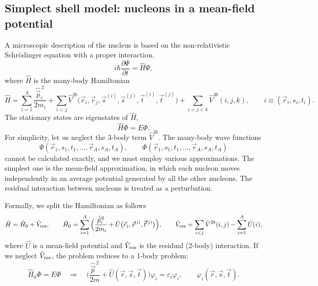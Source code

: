 \documentclass[11pt,a4paper]{article}
\newcommand{\op}[1]{\hat{#1}}
\begin{document}
\subsection{Simplect shell model: nucleons in a mean-field potential}
A microscopic description of the nucleus is based on the non-relativistic Schr\"odinger equation with a proper interaction. 
\[
i\hbar\frac{\partial\Psi}{\partial t}=\op H\Psi ,
\]
where $\op H$ is the many-body Hamiltonian
\[
\op H=\sum_{i=1}^A\frac{\op{\vec p}_i^{\,2}}{2m_i}
+\sum_{i<j}\op V^{2b}\big(\vec r_i,\vec r_j,\vec s^{(i)},\vec s^{(j)},\vec t^{(i)},\vec t^{(j)}\big)
+\sum_{i<j<k}\op V^{3b}(i,j,k),
\qquad i\equiv(\vec r_i,s_i,t_i).
\]
The stationary states are eigenstates of $\op H$,
\[
\op H\Phi=E\Phi .
\]
For simplicity, let us neglect the 3-body term $\op V^{3b}$. The many-body wave functions
\[
\Psi(\vec r_1,s_1,t_1,\dots,\vec r_A,s_A,t_A),\qquad \Phi(\vec r_1,s_1,t_1,\dots,\vec r_A,s_A,t_A)
\]
cannot be calculated exactly, and we must employ various approximations. The simplest one is the mean-field approximation, in which each nucleon moves independently in an average potential generated by all the other nucleons. The residual interaction between nucleons is treated as a perturbation.

Formally, we split the Hamiltonian as follows
\[
\op H=\op H_0+\op V_{\rm res},\qquad
\op H_0=\sum_{i=1}^A\Big(\frac{\op{\vec p}_i^{\,2}}{2m_i}+\op U\big(\vec r_i,\vec s^{(i)},\vec t^{(i)}\big)\Big),
\qquad
\op V_{\rm res}=\sum_{i<j}\op V^{2b}(i,j)-\sum_{i=1}^A\op U(i),
\]
where $\op U$ is a mean-field potential and $\op V_{\rm res}$ is the residual (2-body) interaction.
If we neglect $\op V_{\rm res}$, the problem reduces to a 1-body problem:
\[
\op H_0\Phi=E\Phi\quad\Longrightarrow\quad
\Big(\frac{\op{\vec p}^{\,2}}{2m}+\op U(\vec r,\vec s,\vec t)\Big)\varphi_i=\varepsilon_i\varphi_i ,
\qquad \varphi_i(\vec r,\vec s,\vec t).
\]

\end{document}
